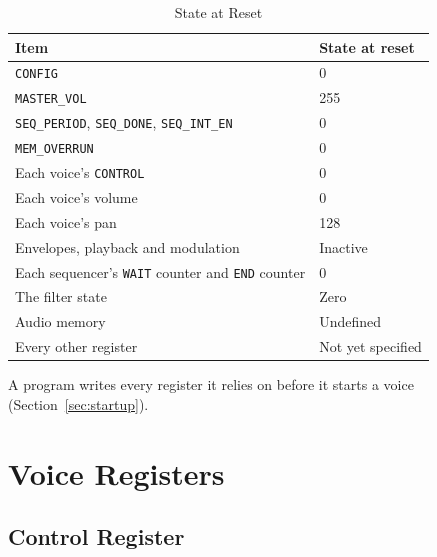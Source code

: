 \begin{table}[H]
	\centering
	\begin{tabular}{ll}
		\toprule
		\textbf{Item}                                                   & \textbf{State at reset} \\
		\midrule
		\texttt{CONFIG}                                                 & 0                       \\
		\texttt{MASTER\_VOL}                                            & 255                     \\
		\texttt{SEQ\_PERIOD}, \texttt{SEQ\_DONE}, \texttt{SEQ\_INT\_EN} & 0                       \\
		\texttt{MEM\_OVERRUN}                                           & 0                       \\
		Each voice's \texttt{CONTROL}                                   & 0                       \\
		Each voice's volume                                             & 0                       \\
		Each voice's pan                                                & 128                     \\
		Envelopes, playback and modulation                              & Inactive                \\
		Each sequencer's \texttt{WAIT} counter and \texttt{END} counter & 0                       \\
		The filter state                                                & Zero                    \\
		Audio memory                                                    & Undefined               \\
		Every other register                                            & Not yet specified       \\
		\bottomrule
	\end{tabular}
	\caption{State at Reset}
	\label{tab:reset}
\end{table}

A program writes every register it relies on before it starts a voice (Section~\ref{sec:startup}).

\section{Voice Registers}
\label{sec:voice-registers}

\subsection{Control Register}
\label{sec:reg-control}

